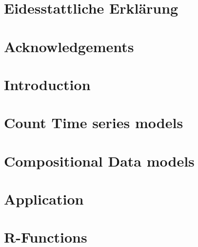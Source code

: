 \documentclass[a4paper,twoside,12pt,appendixprefix=true,bibliography=totoc,listof=totoc]{scrbook}
\begin{document}
\pagestyle{empty} %

\pagestyle{plain} %

\onehalfspacing    %


\chapter*{Eidesstattliche Erklärung}

\chapter*{Acknowledgements}

\tableofcontents %
\cleardoublepage %

\chapter{Introduction}
\label{sec:Introduction}


\chapter{Count Time series models}
\label{sec:CountTS}

\chapter{Compositional Data models}
\label{sec:Coda}



\chapter{Application}
\label{sec:Application}







%

\printbibliography
\listoffigures
\listoftables


\appendix
    \chapter{R-Functions}
		\label{sec:R-Functions}
%		
\end{document}
